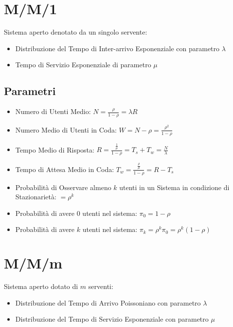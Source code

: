 
\section{M/M/1} \label{mm1}

Sistema aperto denotato da un singolo servente:

\begin{itemize}
    \item Distribuzione del Tempo di Inter-arrivo Esponenziale con parametro
          $\lambda$
    \item Tempo di Servizio Esponenziale di parametro $\mu$
\end{itemize}

\subsection{Parametri}

\begin{itemize}
    \item Numero di Utenti Medio: $N = \frac{\rho}{1 - \rho} = \lambda R$
    \item Numero Medio di Utenti in Coda: $W = N - \rho = \frac{\rho^2}{1-\rho}$
    \item Tempo Medio di Risposta: $R = \frac{\frac{1}{\mu}}{1 - \rho} = T_s +
              T_w = \frac{N}{\lambda}$
    \item Tempo di Attesa Medio in Coda: $T_w = \frac{\frac{\rho}{\mu}}{1 -
                  \rho} = R - T_s$
    \item Probabilità di Osservare almeno $k$ utenti in un Sistema in condizione
          di Stazionarietà: $ = \rho^k$
    \item Probabilità di avere $0$ utenti nel sistema: $\pi_0 = 1 - \rho$
    \item Probabilità di avere $k$ utenti nel sistema: $\pi_k = \rho^k \pi_0 =
              \rho^k (1 - \rho)$
\end{itemize}

\section{M/M/m}

Sistema aperto dotato di $m$ serventi:

\begin{itemize}
    \item Distribuzione del Tempo di Arrivo Poissoniano con parametro $\lambda$
    \item Distribuzione del Tempo di Servizio Esponenziale con parametro $\mu$
\end{itemize}

